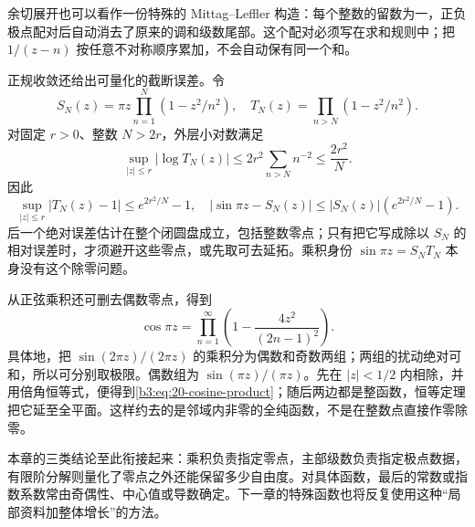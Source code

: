 余切展开也可以看作一份特殊的 Mittag--Leffler 构造：每个整数的留数为一，正负极点配对后自动消去了原来的调和级数尾部。这个配对必须写在求和规则中；把 \(1/(z-n)\) 按任意不对称顺序累加，不会自动保有同一个和。

\ProseParagraphBreak

正规收敛还给出可量化的截断误差。令
\[
 S_N(z)=\pi z\prod_{n=1}^{N}(1-z^2/n^2),
 \quad T_N(z)=\prod_{n>N}(1-z^2/n^2).
\]
对固定 \(r>0\)、整数 \(N>2r\)，外层小对数满足
\[
 \sup_{|z|\le r}|\log T_N(z)|
 \le2r^2\sum_{n>N}n^{-2}\le\frac{2r^2}{N}.
\]
因此
\[
 \sup_{|z|\le r}|T_N(z)-1|\le e^{2r^2/N}-1,
 \quad
 |\sin\pi z-S_N(z)|\le|S_N(z)|\left(e^{2r^2/N}-1\right).
\]
后一个绝对误差估计在整个闭圆盘成立，包括整数零点；只有把它写成除以 \(S_N\) 的相对误差时，才须避开这些零点，或先取可去延拓。乘积身份 \(\sin\pi z=S_NT_N\) 本身没有这个除零问题。

\ProseParagraphBreak

从正弦乘积还可删去偶数零点，得到
\begin{equation}\label{b3:eq:20-cosine-product}
 \cos\pi z=\prod_{n=1}^{\infty}
                  \left(1-\frac{4z^2}{(2n-1)^2}\right).
\end{equation}
具体地，把 \(\sin(2\pi z)/(2\pi z)\) 的乘积分为偶数和奇数两组；两组的扰动绝对可和，所以可分别取极限。偶数组为 \(\sin(\pi z)/(\pi z)\)。先在 \(|z|<1/2\) 内相除，并用倍角恒等式，便得到\eqref{b3:eq:20-cosine-product}；随后两边都是整函数，恒等定理把它延至全平面。这样约去的是邻域内非零的全纯函数，不是在整数点直接作零除零。

\ProseParagraphBreak

本章的三类结论至此衔接起来：乘积负责指定零点，主部级数负责指定极点数据，有限阶分解则量化了零点之外还能保留多少自由度。对具体函数，最后的常数或指数系数常由奇偶性、中心值或导数确定。下一章的特殊函数也将反复使用这种“局部资料加整体增长”的方法。
